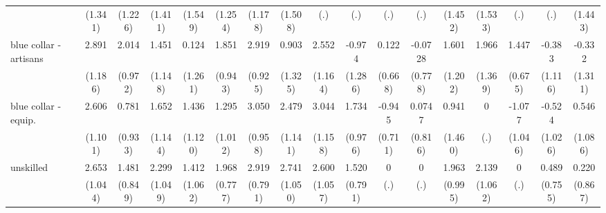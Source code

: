 {\begin{tabular}{l*{16}{c}}
                    &     (1.341)         &     (1.226)         &     (1.411)         &     (1.549)         &     (1.254)         &     (1.178)         &     (1.508)         &         (.)         &         (.)         &         (.)         &         (.)         &     (1.452)         &     (1.533)         &         (.)         &         (.)         &     (1.443)         \\
[1em]
blue collar - artisans&       2.891\sym{*}  &       2.014\sym{*}  &       1.451         &       0.124         &       1.851\sym{*}  &       2.919\sym{**} &       0.903         &       2.552\sym{*}  &      -0.974         &       0.122         &     -0.0728         &       1.601         &       1.966         &       1.447\sym{*}  &      -0.383         &      -0.332         \\
                    &     (1.186)         &     (0.972)         &     (1.148)         &     (1.261)         &     (0.943)         &     (0.925)         &     (1.325)         &     (1.164)         &     (1.286)         &     (0.668)         &     (0.778)         &     (1.202)         &     (1.369)         &     (0.675)         &     (1.116)         &     (1.311)         \\
[1em]
blue collar - equip.&       2.606\sym{*}  &       0.781         &       1.652         &       1.436         &       1.295         &       3.050\sym{**} &       2.479\sym{*}  &       3.044\sym{**} &       1.734         &      -0.945         &      0.0747         &       0.941         &           0         &      -1.077         &      -0.524         &       0.546         \\
                    &     (1.101)         &     (0.933)         &     (1.144)         &     (1.120)         &     (1.012)         &     (0.958)         &     (1.141)         &     (1.158)         &     (0.976)         &     (0.711)         &     (0.816)         &     (1.460)         &         (.)         &     (1.046)         &     (1.026)         &     (1.086)         \\
[1em]
unskilled           &       2.653\sym{*}  &       1.481         &       2.299\sym{*}  &       1.412         &       1.968\sym{*}  &       2.919\sym{***}&       2.741\sym{**} &       2.600\sym{*}  &       1.520         &           0         &           0         &       1.963\sym{*}  &       2.139\sym{*}  &           0         &       0.489         &       0.220         \\
                    &     (1.044)         &     (0.849)         &     (1.049)         &     (1.062)         &     (0.777)         &     (0.791)         &     (1.050)         &     (1.057)         &     (0.791)         &         (.)         &         (.)         &     (0.995)         &     (1.062)         &         (.)         &     (0.755)         &     (0.867)         \\

\end{tabular}}
